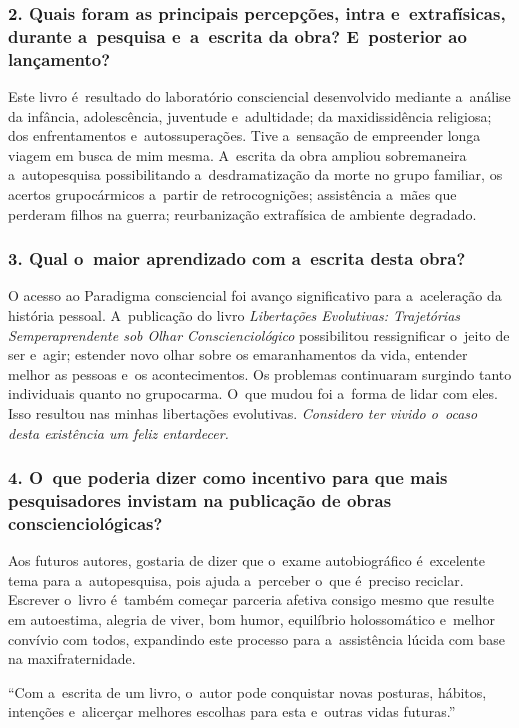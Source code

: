 \documentclass{gescons}
\begin{document}
\begin{multicols}{2}
\subsubsection{2. Quais foram as principais percepções, intra e~extrafísicas, durante a~pesquisa e~a~escrita da obra? E~posterior ao lançamento?}

Este livro é~resultado do laboratório consciencial desenvolvido mediante a~análise da infância, adolescência, juventude e~adultidade; da maxidissidência religiosa; dos enfrentamentos e~autossuperações. Tive a~sensação de empreender longa viagem em busca de mim mesma. A~escrita da obra ampliou sobremaneira a~autopesquisa possibilitando a~desdramatização da morte no grupo familiar, os acertos grupocármicos a~partir de retrocognições; assistência a~mães que perderam filhos na guerra; reurbanização extrafísica de ambiente degradado.


\subsubsection{3. Qual o~maior aprendizado com a~escrita desta obra?}


O acesso ao Paradigma consciencial foi avanço significativo para a~aceleração da história pessoal. A~publicação do livro \emph{Libertações Evolutivas: Trajetórias Semperaprendente sob Olhar Conscienciológico} possibilitou ressignificar o~jeito de ser e~agir; estender novo olhar sobre os emaranhamentos da vida, entender melhor as pessoas e~os acontecimentos. Os problemas continuaram surgindo tanto individuais quanto no grupocarma. O~que mudou foi a~forma de lidar com eles. Isso resultou nas minhas libertações evolutivas. \emph{Considero ter vivido o~ocaso desta existência um feliz entardecer.}

\subsubsection{4. O~que poderia dizer como incentivo para que mais pesquisadores invistam na publicação de obras conscienciológicas?}

Aos futuros autores, gostaria de dizer que o~exame autobiográfico é~excelente tema para a~autopesquisa, pois ajuda a~perceber o~que é~preciso reciclar. Escrever o~livro é~também começar parceria afetiva consigo mesmo que resulte em autoestima, alegria de viver, bom humor, equilíbrio holos­somático e~melhor convívio com todos, expandindo este processo para a~assis­tência lúcida com base na maxifraternidade.


\begin{pullquote}
``Com a~escrita de um livro, o~autor pode conquistar novas posturas, hábitos, intenções e~alicerçar melhores escolhas para esta e~outras vidas futuras.''
\end{pullquote}
    
    \end{multicols}
\end{document}
